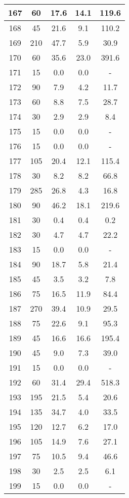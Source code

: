 \documentclass[a4paper,10pt]{article}
\begin{document}
\begin{table}
\begin{tabular}{|c|c|c|c|c|}
\hline
167 & 60 & 17.6 & 14.1 & 119.6 \\
\hline
168 & 45 & 21.6 & 9.1 & 110.2 \\
\hline
169 & 210 & 47.7 & 5.9 & 30.9 \\
\hline
170 & 60 & 35.6 & 23.0 & 391.6 \\
\hline
171 & 15 & 0.0 & 0.0 & - \\
\hline
172 & 90 & 7.9 & 4.2 & 11.7 \\
\hline
173 & 60 & 8.8 & 7.5 & 28.7 \\
\hline
174 & 30 & 2.9 & 2.9 & 8.4 \\
\hline
175 & 15 & 0.0 & 0.0 & - \\
\hline
176 & 15 & 0.0 & 0.0 & - \\
\hline
177 & 105 & 20.4 & 12.1 & 115.4 \\
\hline
178 & 30 & 8.2 & 8.2 & 66.8 \\
\hline
179 & 285 & 26.8 & 4.3 & 16.8 \\
\hline
180 & 90 & 46.2 & 18.1 & 219.6 \\
\hline
181 & 30 & 0.4 & 0.4 & 0.2 \\
\hline
182 & 30 & 4.7 & 4.7 & 22.2 \\
\hline
183 & 15 & 0.0 & 0.0 & - \\
\hline
184 & 90 & 18.7 & 5.8 & 21.4 \\
\hline
185 & 45 & 3.5 & 3.2 & 7.8 \\
\hline
186 & 75 & 16.5 & 11.9 & 84.4 \\
\hline
187 & 270 & 39.4 & 10.9 & 29.5 \\
\hline
188 & 75 & 22.6 & 9.1 & 95.3 \\
\hline
189 & 45 & 16.6 & 16.6 & 195.4 \\
\hline
190 & 45 & 9.0 & 7.3 & 39.0 \\
\hline
191 & 15 & 0.0 & 0.0 & - \\
\hline
192 & 60 & 31.4 & 29.4 & 518.3 \\
\hline
193 & 195 & 21.5 & 5.4 & 20.6 \\
\hline
194 & 135 & 34.7 & 4.0 & 33.5 \\
\hline
195 & 120 & 12.7 & 6.2 & 17.0 \\
\hline
196 & 105 & 14.9 & 7.6 & 27.1 \\
\hline
197 & 75 & 10.5 & 9.4 & 46.6 \\
\hline
198 & 30 & 2.5 & 2.5 & 6.1 \\
\hline
199 & 15 & 0.0 & 0.0 & - \\
\hline

\end{tabular}
\end{table}
\end{document}
